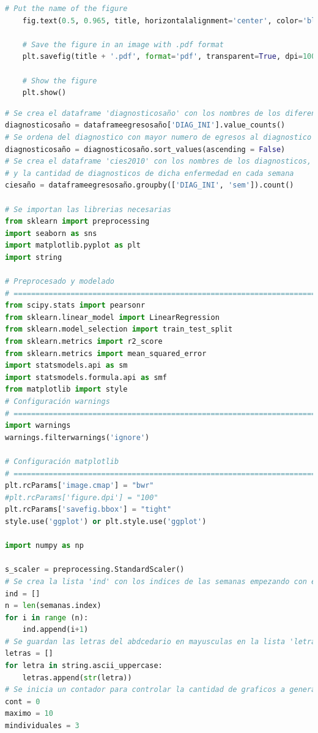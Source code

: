 \begin{lstlisting}[language=Python, caption=Procedimiento del segundo paso, label=lst:c3]
    # Put the name of the figure
    fig.text(0.5, 0.965, title, horizontalalignment='center', color='black', weight='bold', size='large')

    # Save the figure in an image with .pdf format
    plt.savefig(title + '.pdf', format='pdf', transparent=True, dpi=1000)

    # Show the figure
    plt.show()
\end{lstlisting}

\begin{lstlisting}[language=Python, caption=Procedimiento del segundo paso, label=lst:c4]
# Se crea el dataframe 'diagnosticosaño' con los nombres de los diferentes diagnosticos sin repeticion
diagnosticosaño = dataframeegresosaño['DIAG_INI'].value_counts()
# Se ordena del diagnostico con mayor numero de egresos al diagnostico con menor numero de egresos
diagnosticosaño = diagnosticosaño.sort_values(ascending = False)
# Se crea el dataframe 'cies2010' con los nombres de los diagnosticos, los numeros de las semanas, 
# y la cantidad de diagnosticos de dicha enfermedad en cada semana
ciesaño = dataframeegresosaño.groupby(['DIAG_INI', 'sem']).count()

# Se importan las librerias necesarias
from sklearn import preprocessing
import seaborn as sns
import matplotlib.pyplot as plt
import string

# Preprocesado y modelado
# ==============================================================================
from scipy.stats import pearsonr
from sklearn.linear_model import LinearRegression
from sklearn.model_selection import train_test_split
from sklearn.metrics import r2_score
from sklearn.metrics import mean_squared_error
import statsmodels.api as sm
import statsmodels.formula.api as smf
from matplotlib import style
# Configuración warnings
# ==============================================================================
import warnings
warnings.filterwarnings('ignore')

# Configuración matplotlib
# ==============================================================================
plt.rcParams['image.cmap'] = "bwr"
#plt.rcParams['figure.dpi'] = "100"
plt.rcParams['savefig.bbox'] = "tight"
style.use('ggplot') or plt.style.use('ggplot')

import numpy as np

s_scaler = preprocessing.StandardScaler()
# Se crea la lista 'ind' con los indices de las semanas empezando con el 1
ind = []
n = len(semanas.index)
for i in range (n):
    ind.append(i+1)
# Se guardan las letras del abdcedario en mayusculas en la lista 'letras' para la agrupación de CIEs
letras = []
for letra in string.ascii_uppercase:
    letras.append(str(letra))
# Se inicia un contador para controlar la cantidad de graficos a generar
cont = 0
maximo = 10
mindividuales = 3


\end{lstlisting}
